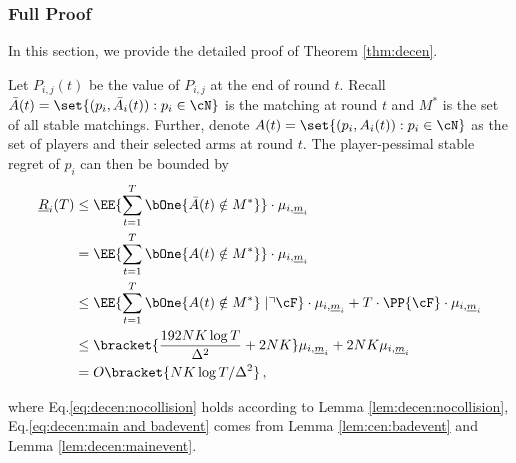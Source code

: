 \subsubsection{Full Proof}\label{sec:proof:full}



In this section, we provide the detailed proof of Theorem \ref{thm:decen}. 




Let $P_{i,j}(t)$ be the value of $P_{i,j}$ at the end of round $t$.
Recall $\bar{A}(t)=\set{(p_i,\bar{A}_i(t)):p_i\in \cN}$ is the matching at round $t$ and $M^*$ is the set of all stable matchings. Further, denote $A(t)=\set{(p_i,A_i(t)):p_i\in \cN}$ as the set of players and their selected arms at round $t$.  
The player-pessimal stable regret of $p_i$ can then be bounded by 
\begin{align}
    \underline{R}_i(T) &\le  \EE{\sum_{t=1}^T \bOne{\bar{A}(t) \notin M^* }}\cdot \mu_{i,\underline{m}_i} \notag\\
    &= \EE{\sum_{t=1}^T \bOne{{A}(t)  \notin M^* }}\cdot \mu_{i,\underline{m}_i} \label{eq:decen:nocollision} \\
    &\le \EE{\sum_{t=1}^T \bOne{{A}(t) \notin M^*  } \mid \urcorner \cF }\cdot \mu_{i,\underline{m}_i} + T\cdot \PP{ \cF}\cdot \mu_{i,\underline{m}_i} \notag \\
    &\le \bracket{\frac{192NK\log T}{\Delta^2} + 2NK} \mu_{i,\underline{m}_i} + 2NK\mu_{i,\underline{m}_i} \label{eq:decen:main and badevent}  \\
    &= O\bracket{NK\log T/\Delta^2} \notag \,,
\end{align}

where Eq.\eqref{eq:decen:nocollision} holds according to Lemma \ref{lem:decen:nocollision}, Eq.\eqref{eq:decen:main and badevent} comes from Lemma \ref{lem:cen:badevent} and Lemma \ref{lem:decen:mainevent}. 






